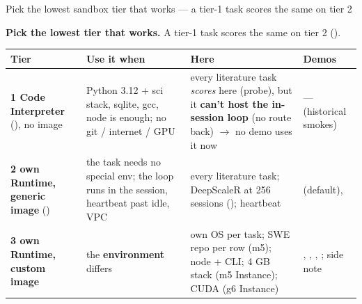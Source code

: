 \begin{frame}{Pick the lowest sandbox tier that works --- a tier-1 task scores the same on tier 2}
{\footnotesize\textbf{Pick the lowest tier that works.} A tier-1 task scores the same on tier 2 ().\par}
\vspace{2mm}
\scriptsize\setlength{\tabcolsep}{4pt}
\begin{tabularx}{\textwidth}{@{}>{\raggedright\arraybackslash}p{2.5cm} Y Y >{\raggedright\arraybackslash}p{2.9cm}@{}}
\toprule
\textbf{Tier} & \textbf{Use it when} & \textbf{Here} & \textbf{Demos}\\
\midrule
\textbf{1 \textperiodcentered{} Code Interpreter} (), no image & Python 3.12 + sci stack, sqlite, gcc, node is enough; no git / internet / GPU & every literature task \emph{scores} here (probe), but it \textbf{can't host the in-session loop} (no route back) $\rightarrow$ no demo uses it now & --- (historical  smokes)\\
\textbf{2 \textperiodcentered{} own Runtime, generic image} (\allowbreak{}) & the task needs no special env; the loop runs in the session, heartbeat past idle, VPC & every literature task; DeepScaleR at 256 sessions (); heartbeat &  (default), \\
\textbf{3 \textperiodcentered{} own Runtime, custom image} & the \textbf{environment} differs & own OS per task; SWE repo per row (m5); node + CLI; 4 GB stack (m5 Instance); CUDA (g6 Instance) & , , , ; side note \allowbreak{}\\
\bottomrule
\end{tabularx}
\end{frame}

